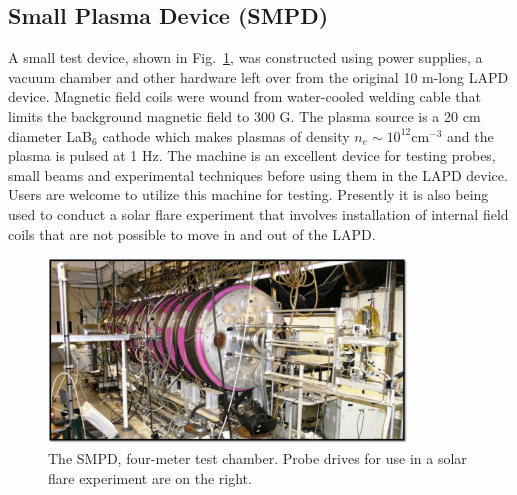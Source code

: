 \documentclass[11pt]{article}
\begin{document}
\subsection{Small Plasma Device (SMPD)}
A small test device, shown in Fig.\ \ref{fig:smpd}, was constructed using power supplies, a vacuum chamber and other hardware left over from the original 10 m-long LAPD device.  Magnetic field coils were wound from water-cooled welding cable that limits the background magnetic field to 300 G.  The plasma source is a 20 cm diameter LaB$_{6}$ cathode which makes plasmas of density $n_{e}\sim 10^{12}$cm$^{-3}$  and the plasma is pulsed at 1 Hz.  The machine is an excellent device for testing probes, small beams and experimental techniques before using them in the LAPD device.  Users are welcome to utilize this machine for testing.  Presently it is also being used to conduct a solar flare experiment that involves installation of internal field coils that are not possible to move in and out of the LAPD.
\begin{figure}[htbp] %
   \centering
   \includegraphics[width=0.85\textwidth]{smpd.jpg} 
   \caption{\small The SMPD, four-meter test chamber.  Probe drives for use in a solar flare experiment are on the right.}
   \label{fig:smpd}
\end{figure}
\end{document}

